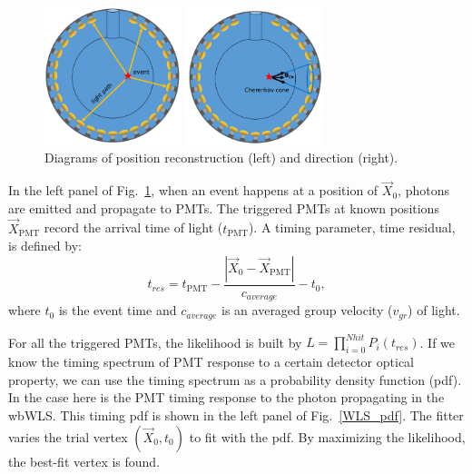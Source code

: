 \documentclass[preprint,12pt]{elsarticle}
\numberwithin{equation}{section}
\begin{document}
\begin{figure}[htbp]
	\centering
	\begin{minipage}[t]{0.4\textwidth}
		\centering
		\includegraphics[width=4cm]{mpwDiagram.png}
	\end{minipage}
	\begin{minipage}[t]{0.4\textwidth}
		\centering
		\includegraphics[width=4cm]{mpwDiagram2.png}
	\end{minipage}
	\caption{Diagrams of position reconstruction (left) and direction (right).}
	\label{mpwdiagram}
\end{figure}

In the left panel of Fig.~\ref{mpwdiagram}, when an event happens at a position of $\vec{X}_{0}$, photons are emitted and propagate to PMTs. The triggered PMTs at known positions $\vec{X}_\mathrm{PMT}$ record the arrival time of light ($t_\mathrm{PMT}$). A timing parameter, time residual, is defined by: 
\begin{equation}
t_{res} = t_\mathrm{PMT}-\frac{|\vec{X}_{0}-\vec{X}_\mathrm{PMT}|}{c_{average}}-t_0,
\end{equation}
where $t_0$ is the event time and $c_{average}$ is an averaged group velocity ($v_{gr}$) of light.

For all the triggered PMTs, the likelihood is built by $L=\prod^{Nhit}_{i=0}P_i(t_{res})$. If we know the timing spectrum of PMT response to a certain detector optical property, we can use the timing spectrum as a probability density function (pdf). In the case here is the PMT timing response to the photon propagating in the wbWLS. This timing pdf is shown in the left panel of Fig.~\ref{WLS_pdf}.
The fitter varies the trial vertex $(\vec{X}_{0},t_0)$ to fit with the pdf. By maximizing the likelihood, the best-fit vertex is found.
\end{document}
